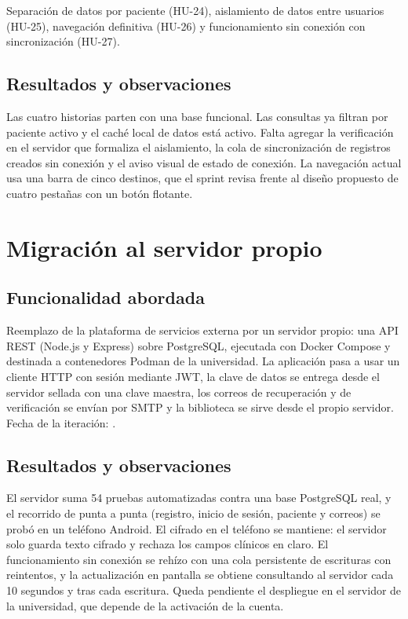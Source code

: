 Separación de datos por paciente (HU-24), aislamiento de datos entre usuarios
(HU-25), navegación definitiva (HU-26) y funcionamiento sin conexión con
sincronización (HU-27).

\subsection*{Resultados y observaciones}

Las cuatro historias parten con una base funcional. Las consultas ya filtran
por paciente activo y el caché local de datos está activo. Falta
agregar la verificación en el servidor que formaliza el aislamiento, la cola de
sincronización de registros creados sin conexión y el aviso visual de estado de
conexión. La navegación actual usa una barra de cinco destinos, que el sprint
revisa frente al diseño propuesto de cuatro pestañas con un botón flotante.

\section{Migración al servidor propio} %

\subsection*{Funcionalidad abordada}

Reemplazo de la plataforma de servicios externa por un servidor propio: una API
REST (Node.js y Express) sobre PostgreSQL, ejecutada con Docker Compose y
destinada a contenedores Podman de la universidad. La aplicación pasa a usar un
cliente HTTP con sesión mediante JWT, la clave de datos se entrega desde el
servidor sellada con una clave maestra, los correos de recuperación y de
verificación se envían por SMTP y la biblioteca se sirve desde el propio
servidor. Fecha de la iteración: .

\subsection*{Resultados y observaciones}

El servidor suma 54 pruebas automatizadas contra una base PostgreSQL real, y el
recorrido de punta a punta (registro, inicio de sesión, paciente y correos) se
probó en un teléfono Android. El cifrado en el teléfono se mantiene: el servidor
solo guarda texto cifrado y rechaza los campos clínicos en claro. El
funcionamiento sin conexión se rehízo con una cola persistente de escrituras
con reintentos, y la actualización en pantalla se obtiene consultando al servidor
cada 10 segundos y tras cada escritura. Queda pendiente el despliegue en el
servidor de la universidad, que depende de la activación de la cuenta.
